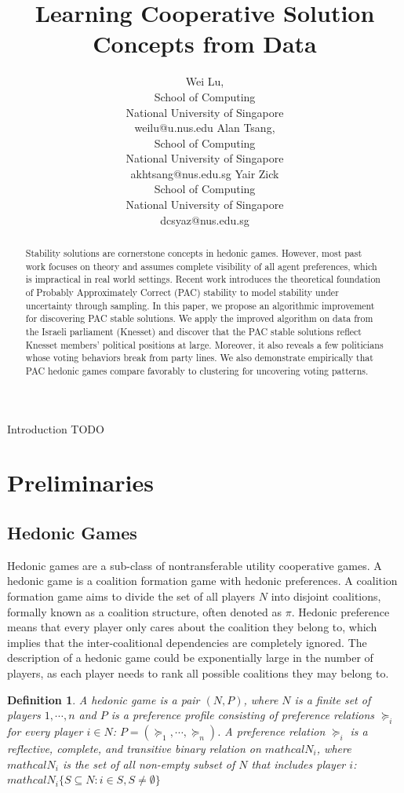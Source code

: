\documentclass[letterpaper]{article} %
\title{Learning Cooperative Solution Concepts from Data}
\author{Wei Lu,\\
School of Computing\\
National University of Singapore\\
weilu@u.nus.edu
\And
Alan Tsang,\\
School of Computing\\
National University of Singapore\\
akhtsang@nus.edu.sg
\And
Yair Zick\\
School of Computing\\
National University of Singapore\\
dcsyaz@nus.edu.sg
}
\newtheorem{definition}{Definition}
\begin{document}
\maketitle

\begin{abstract}
Stability solutions are cornerstone concepts in hedonic games. However, most past work focuses on theory and assumes complete visibility of all agent preferences, which is impractical in real world settings. Recent work introduces the theoretical foundation of Probably Approximately Correct (PAC) stability to model stability under uncertainty through sampling. In this paper, we propose an algorithmic improvement for discovering PAC stable solutions. We apply the improved algorithm on data from the Israeli parliament (Knesset) and discover that the PAC stable solutions reflect Knesset members' political positions at large.  Moreover, it also reveals a few politicians whose voting behaviors break from party lines. We also demonstrate empirically that PAC hedonic games compare favorably to clustering for uncovering voting patterns.
\end{abstract}

\noindent Introduction TODO

\section{Preliminaries}

\subsection{Hedonic Games}
Hedonic games are a sub-class of nontransferable utility cooperative games. A hedonic game is a coalition formation game with hedonic preferences. A coalition formation game aims to divide the set of all players $N$ into disjoint coalitions, formally known as a coalition structure, often denoted as $\pi$. Hedonic preference means that every player only cares about the coalition they belong to, which implies that the inter-coalitional dependencies are completely ignored. The description of a hedonic game could be exponentially large in the number of players, as each player needs to rank all possible coalitions they may belong to.

\begin{definition}
  A {\it hedonic game} is a pair $(N, P)$, where $N$ is a finite set of players $1, \cdots, n$ and $P$ is a {\it preference profile} consisting of preference relations $\succeq_i$ for every player $i \in N$: $P = (\succeq_1, \cdots, \succeq_n)$. A {\it preference relation} $\succeq_i$ is a reflective, complete, and transitive binary relation on $mathcal{N}_i$, where $mathcal{N}_i$ is the set of all non-empty subset of $N$ that includes player $i$: $mathcal{N}_i \{S \subseteq N: i \in S, S \neq \emptyset \}$
\end{definition}
\end{document}
